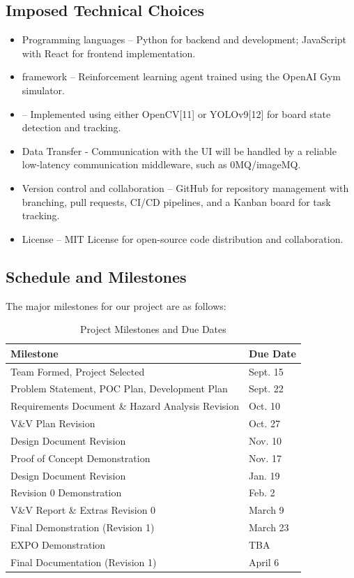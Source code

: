 \documentclass{article}
\begin{document}
\subsection{Imposed Technical Choices}\label{subsec:technicalchoices}
\begin{itemize}
    \item {Programming languages} – Python for backend and \AI{} development; JavaScript with React for frontend implementation.
    \item {\AI{} framework} – Reinforcement learning agent trained using the OpenAI Gym \emph{\Catan{}} simulator.
    \item {\CV{}} – Implemented using either OpenCV[11] or YOLOv9[12] for board state detection and tracking.
    \item {Data Transfer} - Communication with the UI will be handled by a reliable low-latency communication middleware, such as 0MQ/imageMQ.

    \item {Version control and collaboration} – GitHub for repository management with branching, pull requests, CI/CD pipelines, and a Kanban board for task tracking.
    \item {License} – MIT License for open-source code distribution and collaboration.
\end{itemize}

\subsection{Schedule and Milestones}\label{subsec:schedule}
\medskip
The major milestones for our project are as follows:
\begin{table}[htbp]
  \centering
  \begin{tabular}{|l|l|}
  \hline
  \textbf{Milestone} & \textbf{Due Date} \\ \hline
  Team Formed, Project Selected & Sept. 15 \\ \hline
  Problem Statement, POC Plan, Development Plan & Sept. 22 \\ \hline
  Requirements Document \& Hazard Analysis Revision & Oct. 10 \\ \hline
  V\&V Plan Revision & Oct. 27 \\ \hline
  Design Document Revision & Nov. 10 \\ \hline
  Proof of Concept Demonstration & Nov. 17 \\ \hline
  Design Document Revision & Jan. 19 \\ \hline
  Revision 0 Demonstration & Feb. 2 \\ \hline
  V\&V Report \& Extras Revision 0 & March 9 \\ \hline
  Final Demonstration (Revision 1) & March 23 \\ \hline
  EXPO Demonstration & TBA \\ \hline
  Final Documentation (Revision 1) & April 6 \\ \hline
  
  \end{tabular}
  \caption{Project Milestones and Due Dates}
  \label{tab:project-milestones}
  \end{table}
\end{document}
